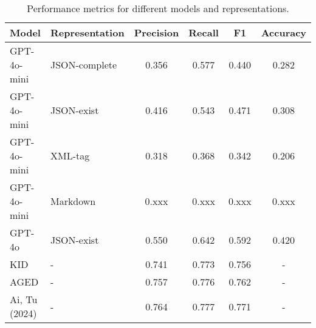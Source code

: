 \begin{table*}
    \centering
    \begin{tabularx}{\textwidth}{Xlcccc}
        \hline
        Model & Representation & Precision & Recall & F1 & Accuracy \\ 
        \hline
        GPT-4o-mini     & JSON-complete     & 0.356 & 0.577 & 0.440 & 0.282 \\ 
        GPT-4o-mini     & JSON-exist        & 0.416 & 0.543 & 0.471 & 0.308 \\ 
        GPT-4o-mini     & XML-tag           & 0.318 & 0.368 & 0.342 & 0.206 \\ 
        GPT-4o-mini     & Markdown          & 0.xxx & 0.xxx & 0.xxx & 0.xxx \\ 
        GPT-4o          & JSON-exist        & 0.550 & 0.642 & 0.592 & 0.420 \\ 
        \hline
        KID             & -                 & 0.741 & 0.773 & 0.756 & - \\ 
        AGED            & -                 & 0.757 & 0.776 & 0.762 & - \\ 
        Ai, Tu (2024)   & -                 & 0.764 & 0.777 & 0.771 & - \\ 
        \hline
        
        \hline
    \end{tabularx}
    \caption{Performance metrics for different models and representations.}
    \label{tab:model_representation_performance}
\end{table*}



